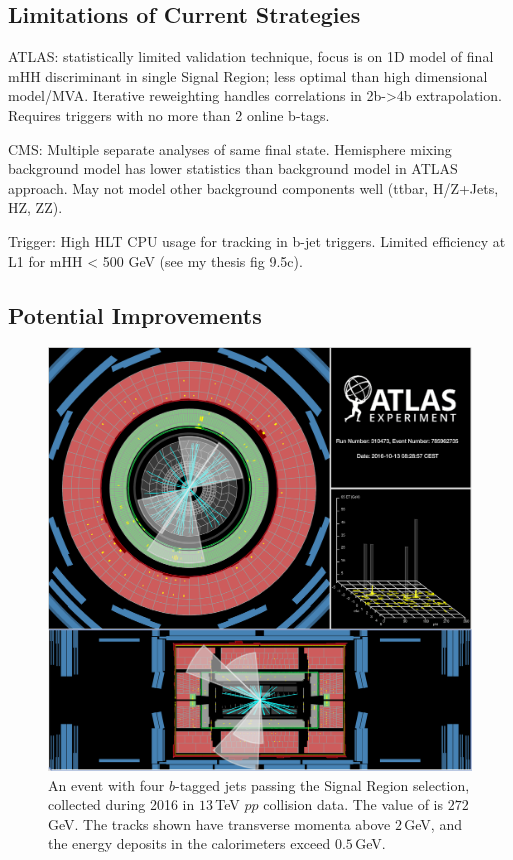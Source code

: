 \subsection{Limitations of Current Strategies}
\label{sec:limitations4b}

ATLAS: statistically limited validation technique, focus is on 1D model of final mHH discriminant in single Signal Region; less optimal than high dimensional model/MVA.  Iterative reweighting handles correlations in 2b->4b extrapolation. Requires triggers with no more than 2 online b-tags.

CMS: Multiple separate analyses of same final state. Hemisphere mixing background model has lower statistics than background model in ATLAS approach. May not model other background components well (ttbar, H/Z+Jets, HZ, ZZ).

Trigger: High HLT CPU usage for tracking in b-jet triggers. Limited efficiency at L1 for mHH < 500 GeV (see my thesis fig 9.5c).

\subsection{Potential Improvements}
\label{sec:improvements4b}

\begin{figure}
  \begin{center}
    \includegraphics[width=\linewidth]{figures/HH4b/272GeV.pdf}
    \caption{An event with four $b$-tagged jets passing the Signal Region selection,
      collected during 2016 in $13\,$TeV $pp$ collision data. The value of \mhh is $272\,$GeV.
      The tracks shown have transverse momenta above $2\,$GeV, and the energy deposits in the calorimeters exceed $0.5\,$GeV.}
    \label{fig:eventDisplay4b}
  \end{center}
\end{figure}

